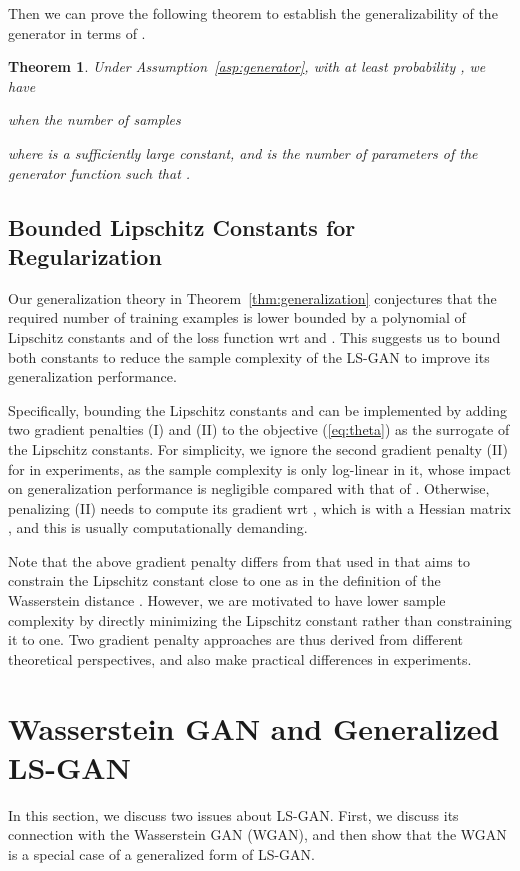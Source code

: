 \documentclass[11pt,fullpage, letterpaper,twoside]{article}
\newtheorem{theorem}{Theorem}
\newcommand{\1}[1]{\mathds{1}_{\left[#1\right]}}
\begin{document}
Then we can prove the following theorem to establish the generalizability of the generator in terms of .
\begin{theorem}Under Assumption~\ref{asp:generator}, with at least probability , we have

when the number of samples

where  is a sufficiently large constant, and  is the number of parameters of the generator function such that .
\end{theorem}

\subsection{Bounded Lipschitz Constants for Regularization}

Our generalization theory  in Theorem~\ref{thm:generalization} conjectures that the required number of training examples is lower bounded by a polynomial of Lipschitz constants  and  of the loss function wrt  and . This suggests us to bound both constants to reduce the sample complexity of the LS-GAN to improve its generalization performance.



Specifically, bounding the Lipschitz constants  and  can be implemented by adding two gradient penalties (I)  and (II) 
to the objective (\ref{eq:theta}) as the surrogate of the Lipschitz constants. For simplicity, we  ignore the second gradient penalty (II) for  in experiments, as the sample complexity is only log-linear in it, whose impact on generalization performance is negligible compared with that of . Otherwise, penalizing (II) needs to compute its gradient wrt , which is  with a Hessian matrix , and this is usually computationally demanding.

Note that the above gradient penalty differs from that used in \cite{gulrajani2017improved} that aims to constrain the Lipschitz constant  close to one as in the definition of the Wasserstein distance \cite{wgan17}. However, we are motivated to have lower sample complexity by directly minimizing the Lipschitz constant rather than constraining it to one.  Two gradient penalty approaches are thus derived from different theoretical perspectives, and also make practical differences in experiments.




\section{Wasserstein GAN and Generalized LS-GAN}
In this section, we discuss two issues about LS-GAN.  First, we discuss its connection with the Wasserstein GAN (WGAN), and then show that the WGAN is a special case of a generalized form of LS-GAN.
\end{document}
